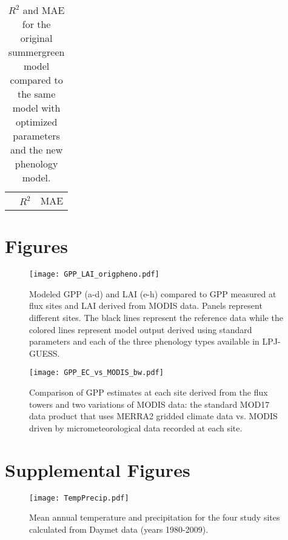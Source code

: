 \documentclass[]{article}
\begin{document}
\begin{table}[ht]
	\begin{threeparttable} %
		\caption{$R^2$ and MAE for the original summergreen model compared to the same model with optimized parameters and the new phenology model.} 
		\begin{tabular}{lrrrr}
			\toprule
			& \multicolumn{2}{c}{$R^2$} & \multicolumn{2}{c}{MAE} \\
			\cmidrule(lr){2-3} \cmidrule(lr){4-5}
			
		\end{tabular}
	\end{threeparttable}
\end{table}

\section{Figures}

\begin{figure}[!htbp]
\begin{measuredfigure}
	\texttt{[image: GPP\_LAI\_origpheno.pdf]}
	\caption{Modeled GPP (a-d) and LAI (e-h) compared to GPP measured at flux sites and LAI derived from MODIS data. Panels represent different sites. The black lines represent the reference data while the colored lines represent model output derived using standard parameters and each of the three phenology types available in LPJ-GUESS.}
	\label{fig:origpheno}
	\end{measuredfigure}
\end{figure}

\begin{figure}[!htbp]
	\begin{measuredfigure}
		\texttt{[image: GPP\_EC\_vs\_MODIS\_bw.pdf]}
		\caption{Comparison of GPP estimates at each site derived from the flux towers and two variations of MODIS data: the standard MOD17 data product that uses MERRA2 gridded climate data vs. MODIS driven by micrometeorological data recorded at each site.}
		\label{fig:modis}
	\end{measuredfigure}
\end{figure}

\section{Supplemental Figures}
\begin{figure}[!htbp]
	\begin{measuredfigure}
		\texttt{[image: TempPrecip.pdf]}
		\caption{Mean annual temperature and precipitation for the four study sites calculated from Daymet data (years 1980-2009).}
		\label{fig:tempprecip}
	\end{measuredfigure}
\end{figure}
\end{document}
